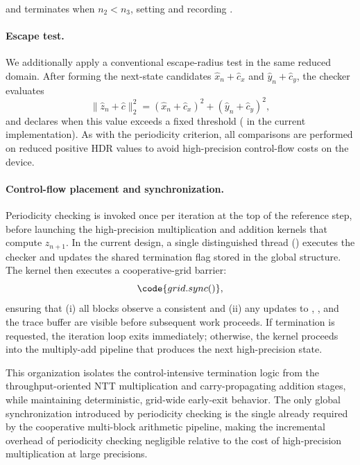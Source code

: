 and terminates when \(n_2 < n_3\), setting  and recording .

\paragraph{Escape test.}
We additionally apply a conventional escape-radius test in the same reduced
domain. After forming the next-state candidates
\(
\widehat{x}_n + \widehat{c}_x
\)
and
\(
\widehat{y}_n + \widehat{c}_y
\),
the checker evaluates
\begin{equation}
  \|\widehat{z}_n + \widehat{c}\|_2^2
  = (\widehat{x}_n + \widehat{c}_x)^2 + (\widehat{y}_n + \widehat{c}_y)^2,
\end{equation}
and declares  when this value exceeds a fixed threshold
( in the current implementation). As with the periodicity
criterion, all comparisons are performed on reduced positive HDR values to avoid
high-precision control-flow costs on the device.

\paragraph{Control-flow placement and synchronization.}
Periodicity checking is invoked once per iteration at the top of the reference
step, before launching the high-precision multiplication and addition kernels
that compute \(z_{n+1}\). In the current design, a single distinguished thread
() executes the checker and updates the shared
termination flag stored in the global  structure. The kernel
then executes a cooperative-grid barrier:
\begin{equation}
  \code{grid.sync()},
\end{equation}
ensuring that (i) all blocks observe a consistent  and
(ii) any updates to , , and the trace buffer are
visible before subsequent work proceeds. If termination is requested, the
iteration loop exits immediately; otherwise, the kernel proceeds into the
multiply-add pipeline that produces the next high-precision state.

This organization isolates the control-intensive termination logic from the
throughput-oriented NTT multiplication and carry-propagating addition stages,
while maintaining deterministic, grid-wide early-exit behavior. The only global
synchronization introduced by periodicity checking is the single 
already required by the cooperative multi-block arithmetic pipeline, making the
incremental overhead of periodicity checking negligible relative to the cost of
high-precision multiplication at large precisions.

